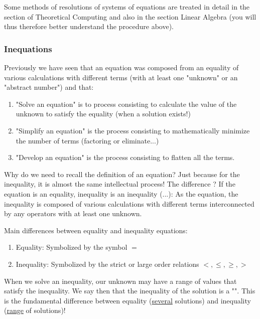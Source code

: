 	Some methods of resolutions of systems of equations are treated in detail in the section of Theoretical Computing and also in the section Linear Algebra (you will thus therefore better understand the procedure above).
	 
	 \subsubsection{Inequations}
	 Previously we have seen that an equation was composed from an equality of various calculations with different terms (with at least one  "unknown" or an "abstract number") and that:
 	\begin{enumerate}
 	  \item "Solve an equation" is to process consisting to calculate the  value of the unknown to satisfy the equality (when a solution exists!)
 	  
 	  \item "Simplify an equation" is the process consisting to mathematically minimize the number of terms (factoring or eliminate...)
 	  
 	  \item "Develop an equation" is the process consisting to flatten all the terms.
 	\end{enumerate}
	Why do we need to recall the definition of an equation? Just because for the inequality, it is almost the same intellectual process! The difference ? If the equation is an equality, inequality is an inequality (...): As the equation, the inequality is composed of various calculations with different terms interconnected by any operators with at least one unknown.
	
	Main differences between equality and inequality equations:
	
	\begin{enumerate}
		\item Equality: Symbolized by the symbol $=$
		
		\item Inequality: Symbolized by the strict or large order relations $<, \leq, \geq, >$
	\end{enumerate}
		
	When we solve an inequality, our unknown may have a range of values that satisfy the inequality. We say then that the inequality of the solution is a "". This is the fundamental difference between equality (\underline{several} solutions) and inequality (\underline{range} of solutions)!
	
